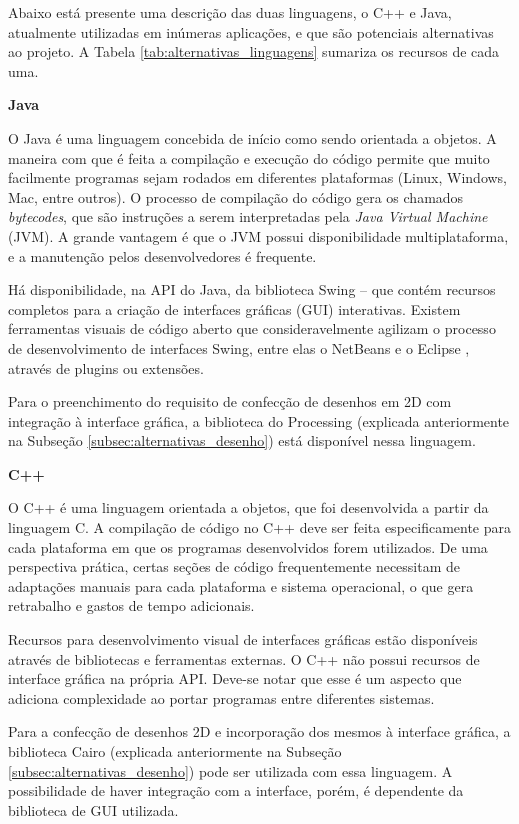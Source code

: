 Abaixo está presente uma descrição das duas linguagens, o C++ e Java, atualmente utilizadas em inúmeras aplicações, e que são potenciais alternativas ao projeto. A Tabela \ref{tab:alternativas_linguagens} sumariza os recursos de cada uma.

\textbf{Java}

O Java \cite{java} é uma linguagem concebida de início como sendo orientada a objetos. A maneira com que é feita a compilação e execução do código permite que muito facilmente programas sejam rodados em diferentes plataformas (Linux, Windows, Mac, entre outros). O processo de compilação do código gera os chamados \textit{bytecodes}, que são instruções a serem interpretadas pela \textit{Java Virtual Machine} (JVM). A grande vantagem é que o JVM possui disponibilidade multiplataforma, e a manutenção pelos desenvolvedores é frequente.

Há disponibilidade, na API do Java, da biblioteca Swing -- que contém recursos completos para a criação de interfaces gráficas (GUI) interativas. Existem ferramentas visuais de código aberto que consideravelmente agilizam o processo de desenvolvimento de interfaces Swing, entre elas o NetBeans \cite{netbeans} e o Eclipse \cite{eclipse}, através de plugins ou extensões. 

Para o preenchimento do requisito de confecção de desenhos em 2D com integração à interface gráfica, a biblioteca do Processing (explicada anteriormente na Subseção \ref{subsec:alternativas_desenho}) está disponível nessa linguagem.


\textbf{C++}

O C++ é uma linguagem orientada a objetos, que foi desenvolvida a partir da linguagem C. A compilação de código no C++ deve ser feita especificamente para cada plataforma em que os programas desenvolvidos forem utilizados. De uma perspectiva prática, certas seções de código frequentemente necessitam de adaptações manuais para cada plataforma e sistema operacional, o que gera retrabalho e gastos de tempo adicionais. 

Recursos para desenvolvimento visual de interfaces gráficas estão disponíveis através de bibliotecas e ferramentas externas. O C++ não possui recursos de interface gráfica na própria API. Deve-se notar que esse é um aspecto que adiciona complexidade ao portar programas entre diferentes sistemas. 

Para a confecção de desenhos 2D e incorporação dos mesmos à interface gráfica, a biblioteca Cairo (explicada anteriormente na Subseção \ref{subsec:alternativas_desenho}) pode ser utilizada com essa linguagem. A possibilidade de haver integração com a interface, porém, é dependente da biblioteca de GUI utilizada.


